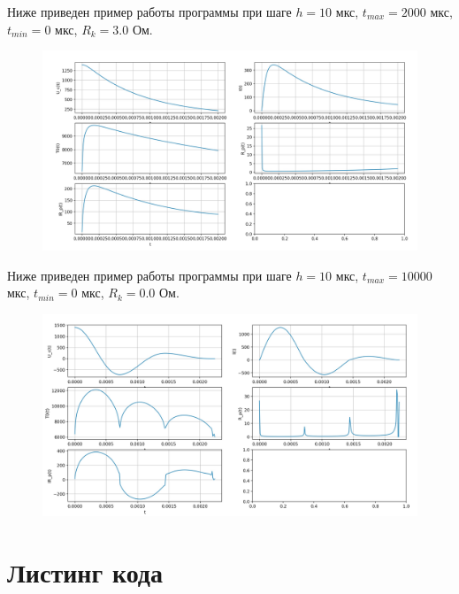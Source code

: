 \documentclass[a4paper,12pt]{article}
\begin{document}
Ниже приведен пример работы программы при шаге $h = 10$ мкс, $t_{max} = 2000$ мкс, $t_{min} = 0$ мкс, $R_k = 3.0 $ Ом.

\begin{figure}[h!]
	\begin{center}
		{\includegraphics[scale = 0.2]{2000.jpg}}
		\label{700}
	\end{center}
\end{figure}

Ниже приведен пример работы программы при шаге $h = 10$ мкс, $t_{max} = 10000$ мкс, $t_{min} = 0$ мкс, $R_k = 0.0 $ Ом.

\begin{figure}[h!]
	\begin{center}
		{\includegraphics[scale = 0.2]{0.jpg}}
		\label{700}
	\end{center}
\end{figure}


\section{Листинг кода}
\end{document}
